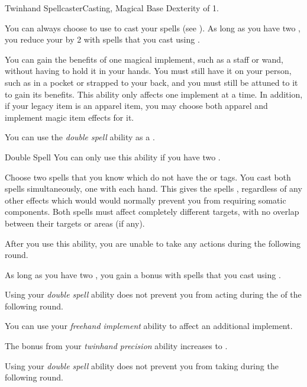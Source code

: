     \begin{feat}{Twinhand Spellcaster}{Casting, Magical}
        \featpre Base Dexterity of 1.

         You can always choose to use  to cast your spells (see ).
        As long as you have two , you reduce your  by 2 with spells that you cast using .

         You can gain the benefits of one magical implement, such as a staff or wand, without having to hold it in your hands.
        You must still have it on your person, such as in a pocket or strapped to your back, and you must still be attuned to it to gain its benefits.
        This ability only affects one implement at a time.
        In addition, if your legacy item is an apparel item, you may choose both apparel and implement magic item effects for it.

         You can use the \textit{double spell} ability as a .
        \begin{instantability}{Double Spell}
            You can only use this ability if you have two .

            Choose two spells that you know which do not have the  or  tags.
            You cast both spells simultaneously, one with each hand.
            This gives the spells , regardless of any other effects which would would normally prevent you from requiring somatic components.
            Both spells must affect completely different targets, with no overlap between their targets or areas (if any).

            After you use this ability, you are unable to take any actions during the following round.
        \end{instantability}

         As long as you have two , you gain a   bonus with spells that you cast using .

         Using your \textit{double spell} ability does not prevent you from acting during the  of the following round.

         You can use your \textit{freehand implement} ability to affect an additional implement.

         The bonus from your \textit{twinhand precision} ability increases to .

         Using your \textit{double spell} ability does not prevent you from taking  during the following round.
    \end{feat}

